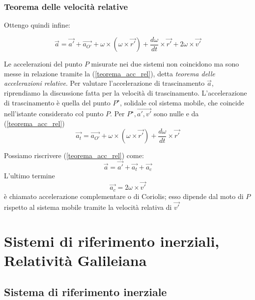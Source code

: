 \documentclass[class=book, crop=false, oneside, 12pt]{standalone}
\begin{document}
\subsubsection{Teorema delle velocità relative}

Ottengo quindi infine:

\begin{equation}
    \overrightarrow{a} = \overrightarrow{a'} + \overrightarrow{a_{O'}} + \omega \times ( \omega \times \overrightarrow{r'}) + \frac{d \omega}{dt} \times \overrightarrow{r'} + 2 \omega \times \overrightarrow{v'}
\end{equation}

Le accelerazioni del punto \(P\) misurate nei due sistemi non coincidono ma sono messe in relazione tramite la (\ref{teorema_acc_rel}), detta \emph{teorema delle accelerazioni relative}.
Per valutare l'accelerazione di trascinamento \(\overrightarrow{a}\), riprendiamo la discussione fatta per la velocità di trascinamento. 
L'accelerazione di trascinamento è quella del punto \(P^{\star}\), solidale col sistema mobile, che coincide nell'istante considerato col punto \(P\). 
Per \(P^{\star}, \overrightarrow{a', v'}\) sono nulle e da (\ref{teorema_acc_rel})
\begin{equation}
    \overrightarrow{a_t} = \overrightarrow{a_{O'}} + \omega \times (\omega \times \overrightarrow{r'}) + \frac{d \omega }{dt} \times \overrightarrow{r'}
\end{equation}

Possiamo riscrivere (\ref{teorema_acc_rel}) come:
\begin{equation}  \label{teorema_acc_cor}
    \overrightarrow{a} = \overrightarrow{a'} + \overrightarrow{a_t} + \overrightarrow{a_c}
\end{equation}
L'ultimo termine
\begin{equation}
    \overrightarrow{a_c} = 2 \omega \times \overrightarrow{v'}
\end{equation}
è chiamato accelerazione complementare o di Coriolis; esso dipende dal moto di \(P\) rispetto al sistema mobile tramite la velocità relativa di \(\overrightarrow{v'}\)

\section{Sistemi di riferimento inerziali, Relatività Galileiana}

\subsection{Sistema di riferimento inerziale}
\end{document}
